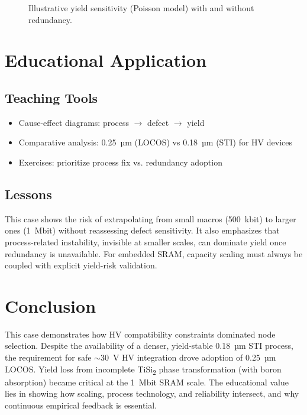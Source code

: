 \documentclass[conference]{IEEEtran}
\begin{document}
\begin{figure}[!t]
  \centering
  \caption{Illustrative yield sensitivity (Poisson model) with and without redundancy.}
  \label{fig:yield}
\end{figure}

\section{Educational Application}
\subsection{Teaching Tools}
\begin{itemize}
    \item Cause-effect diagrams: process $\rightarrow$ defect $\rightarrow$ yield
    \item Comparative analysis: 0.25~µm (LOCOS) vs 0.18~µm (STI) for HV devices
    \item Exercises: prioritize process fix vs. redundancy adoption
\end{itemize}

\subsection{Lessons}
This case shows the risk of extrapolating from small macros (500~kbit) to larger ones (1~Mbit) without reassessing defect sensitivity.  
It also emphasizes that process-related instability, invisible at smaller scales, can dominate yield once redundancy is unavailable.  
For embedded SRAM, capacity scaling must always be coupled with explicit yield-risk validation.

\section{Conclusion}
This case demonstrates how HV compatibility constraints dominated node selection.  
Despite the availability of a denser, yield-stable 0.18~µm STI process, the requirement for safe $\sim$30~V HV integration drove adoption of 0.25~µm LOCOS.  
Yield loss from incomplete TiSi\textsubscript{2} phase transformation (with boron absorption) became critical at the 1~Mbit SRAM scale.  
The educational value lies in showing how scaling, process technology, and reliability intersect, and why continuous empirical feedback is essential.
\end{document}
